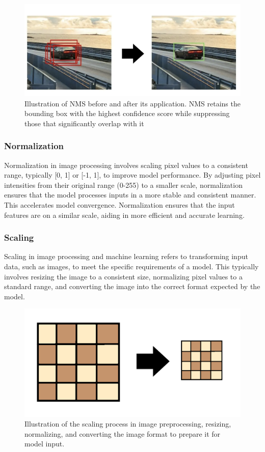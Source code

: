 \begin{figure}[h!]
    \centering
    \includegraphics[width=0.75\linewidth]{figures/theory/image-recognition/nms.png}
    \caption[Non-maximum suppression (NMS) before and after applying the algorithm]{Illustration of NMS before and after its application. NMS retains the bounding box with the highest confidence score while suppressing those that significantly overlap with it \cite{thepythoncode:nms}}
    \label{fig:nms}
\end{figure}

\subsubsection*{Normalization}

Normalization in image processing involves scaling pixel values to a consistent range, typically [0, 1] or [-1, 1], to improve model performance. By adjusting pixel intensities from their original range (0-255) to a smaller scale, normalization ensures that the model processes inputs in a more stable and consistent manner. This accelerates model convergence. Normalization ensures that the input features are on a similar scale, aiding in more efficient and accurate learning.

\subsubsection*{Scaling}

Scaling in image processing and machine learning refers to transforming input data, such as images, to meet the specific requirements of a model. This typically involves resizing the image to a consistent size, normalizing pixel values to a standard range, and converting the image into the correct format expected by the model.

\begin{figure}[h!]
    \centering
    \includegraphics[width=0.75\linewidth]{figures/theory/image-recognition/scaling.png}
    \caption[Scaling process in image preprocessing]{Illustration of the scaling process in image preprocessing, resizing, normalizing, and converting the image format to prepare it for model input. \cite{thepythoncode:nms}}
    \label{fig:nms}
\end{figure}

